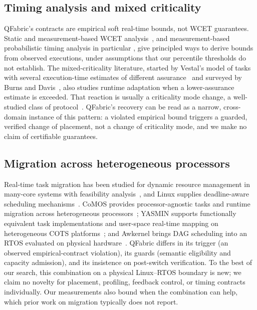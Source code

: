 \documentclass[conference]{IEEEtran}
\newcommand{\system}{QFabric\xspace}
\begin{document}
\subsection{Timing analysis and mixed criticality}
\system's contracts are empirical soft real-time bounds, not WCET guarantees.
Static and measurement-based WCET analysis~\cite{wilhelm2008wcet}, and
measurement-based probabilistic timing analysis in particular
\cite{cucugrosjean2012mbpta,davis2019probabilistic}, give principled ways to
derive bounds from observed executions, under assumptions that our percentile
thresholds do not establish. The mixed-criticality literature, started by
Vestal's model of tasks with several execution-time estimates of different
assurance~\cite{vestal2007preemptive} and surveyed by Burns and
Davis~\cite{burns2017survey}, also studies runtime adaptation when a
lower-assurance estimate is exceeded. That reaction is usually a criticality
mode change, a well-studied class of protocol~\cite{real2004mode}. \system's
recovery can be read as a narrow, cross-domain instance of this pattern: a
violated empirical bound triggers a guarded, verified change of placement,
not a change of criticality mode, and we make no claim of certifiable
guarantees.

\subsection{Migration across heterogeneous processors}
Real-time task migration has been studied for dynamic resource management in
many-core systems with feasibility analysis~\cite{pourmohseni2020migration},
and Linux supplies deadline-aware scheduling
mechanisms~\cite{lelli2016deadline}. CoMOS provides processor-agnostic tasks
and runtime migration across heterogeneous processors~\cite{goraczko2006comos};
YASMIN supports functionally equivalent task implementations and user-space
real-time mapping on heterogeneous COTS platforms~\cite{rouxel2021yasmin}; and
Awkernel brings DAG scheduling into an RTOS evaluated on physical
hardware~\cite{yano2026awkernel}. \system differs in its trigger (an observed
empirical-contract violation), its guards (semantic eligibility and capacity
admission), and its insistence on post-switch verification. To the best of
our search, this combination on a physical Linux--RTOS boundary is new; we
claim no novelty for placement, profiling, feedback control, or timing
contracts individually. Our measurements also bound when the combination can
help, which prior work on migration typically does not report.
\end{document}
